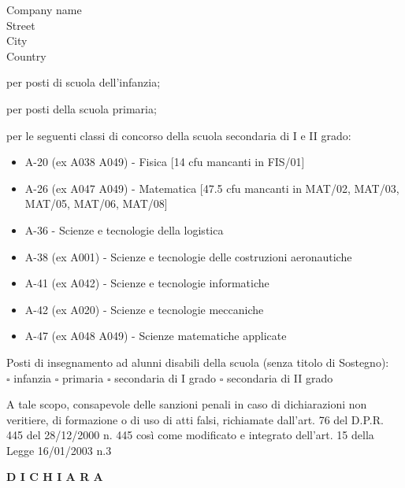 \begin{letter}{Company name \\ Street\\ City\\ Country}
\begin{todolist}[itemsep=0pt,parsep=0pt]
  \item per posti di scuola dell'infanzia;
  \item per posti della scuola primaria;
	\item[\done] per le seguenti classi di concorso della scuola secondaria di I e II grado:
		\begin{itemize}[itemsep=0pt,parsep=0pt]
			\item A-20 (ex A038 A049) - Fisica [14 cfu mancanti in FIS/01]
			\item A-26 (ex A047 A049) - Matematica [47.5 cfu mancanti in MAT/02, MAT/03, MAT\-/05, MAT/06, MAT/08]
			\item A-36 - Scienze e tecnologie della logistica
			\item A-38 (ex A001) - Scienze e tecnologie delle costruzioni aeronautiche
			\item A-41 (ex A042) - Scienze e tecnologie informatiche
			\item A-42 (ex A020) - Scienze e tecnologie meccaniche
			\item A-47 (ex A048 A049) - Scienze matematiche applicate
		\end{itemize}
	\item Posti di insegnamento ad alunni disabili della scuola (senza titolo di Sostegno): \\
				$\square$ infanzia \hfill $\square$ primaria \hfill $\square$ secondaria di I grado  \hfill $\square$ secondaria di II grado
\end{todolist}


A tale scopo, consapevole delle sanzioni penali in caso di dichiarazioni non veritiere, di formazione o di uso di atti falsi, richiamate dall'art. 76 del D.P.R. 445 del 28/12/2000 n. 445 così come modificato e integrato dell'art. 15 della Legge 16/01/2003 n.3 
\begin{center}
\textbf{D I C H I A R A}
\end{center}



\end{letter}
